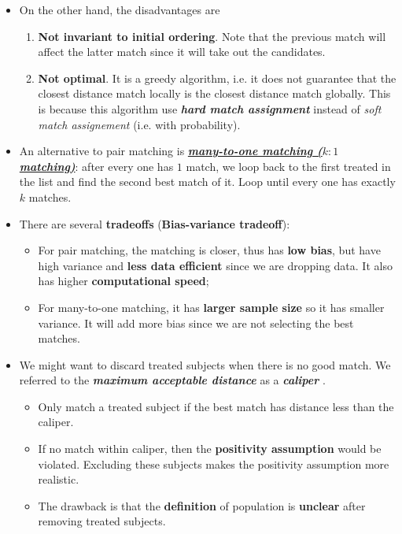 \documentclass[11pt]{article}
\begin{document}
\begin{itemize}
\item On the other hand, the disadvantages are
\begin{enumerate}
\item \textbf{Not invariant to initial ordering}. Note that the previous match will affect the latter match since it will take out the candidates.  
\item \textbf{Not optimal}. It is a greedy algorithm, i.e. it does not guarantee that the closest distance match locally is the closest distance match globally. This is because this algorithm use \emph{\textbf{hard match assignment}} instead of \emph{soft match assignement} (i.e. with probability).
\end{enumerate}

\item An alternative to pair matching is \underline{\textbf{\emph{many-to-one matching ($k:1$ matching)}}}: after every one has $1$ match, we loop back to the first treated in the list and find the second best match of it. Loop until every one has exactly $k$ matches. 

\item There are several \textbf{tradeoffs} (\textbf{Bias-variance tradeoff}):
\begin{itemize}
\item  For pair matching, the matching is closer, thus has \textbf{low bias}, but have high variance and \textbf{less data efficient} since we are dropping data. It also has higher \textbf{computational speed}; 
\item  For many-to-one matching, it has \textbf{larger sample size} so it has smaller variance. It will add more bias since we are not selecting the best matches.
\end{itemize}

\item We might want to discard treated subjects when there is no good match. We referred to the \emph{\textbf{maximum acceptable distance}} as  a \emph{\textbf{caliper}} \citep{rosenbaum2017observation}.
\begin{itemize}
\item Only match a treated subject if the best match has distance less than the caliper. 
\item If no match within caliper, then the \textbf{positivity assumption} would be violated. Excluding these subjects makes the positivity assumption more realistic.
\item The drawback is that the \textbf{definition} of population is \textbf{unclear} after removing treated subjects.
\end{itemize}
\end{itemize}
\end{document}
